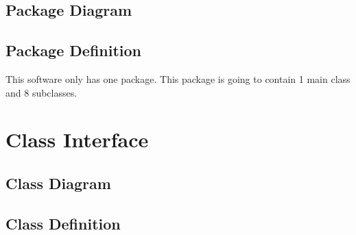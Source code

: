 \documentclass[titlepage]{article}
\begin{document}
\subsection{Package Diagram}

\subsection{Package Definition}
\item This software only has one package. This package is going to contain 1 main class and 8 subclasses.


\section{Class Interface}

\subsection{Class Diagram}


\subsection{Class Definition}
\item 
\end{document}
